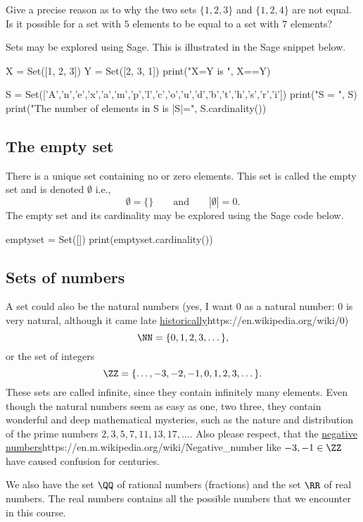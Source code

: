 \documentclass{article}
\begin{document}
\beginshex
Give a precise reason as to why the two sets $\{1, 2, 3\}$ and $\{1, 2, 4\}$ are not equal.
Is it possible for a set with $5$ elements to be equal to a set with $7$ elements?
\endshex



Sets may be explored using Sage. This is illustrated in the Sage snippet below.

\begin{code}
X = Set([1, 2, 3])
Y = Set([2, 3, 1])
print("X=Y is ", X==Y)

S = Set(['A','n','e','x','a','m','p','l','c','o','u','d','b','t','h','s','r','i'])
print("S = ", S) 
print("The number of elements in S is |S|=", S.cardinality())
\end{code}


\subsection{The empty set}

There is a unique set containing no or zero elements. This set is called the empty set and
is denoted $\emptyset$ i.e.,
$$
\emptyset = \{\}\qquad\text{and}\qquad |\emptyset| = 0.
$$
The empty set and its cardinality may be explored using the Sage code below.

\begin{code}
emptyset = Set([])
print(emptyset.cardinality())
\end{code}




\subsection{Sets of numbers}

A set could also be the natural numbers (yes, I want $0$ as a natural number:
$0$ is very natural, although it came late \url{historically}{https://en.wikipedia.org/wiki/0})
$$
\NN = \{0, 1, 2, 3, \dots\},
$$
or the set of integers
$$
\ZZ = \{\dots, -3, -2, -1, 0, 1, 2, 3, \dots\}.
$$
These sets are called infinite, since they contain infinitely many elements. Even though
the natural numbers seem as easy as one, two three, they contain wonderful and deep
mathematical mysteries, such as the nature and distribution of the prime numbers
$2, 3, 5, 7, 11, 13, 17, \dots$. Also please respect, that the \url{negative numbers}{https://en.m.wikipedia.org/wiki/Negative_number} like
$-3, -1\in \ZZ$ have caused confusion for centuries.
 
We also have
the set $\QQ$ of rational numbers (fractions) and the set
$\RR$ of real numbers. The real numbers
contains all the possible numbers that we encounter in 
this course.
\end{document}
